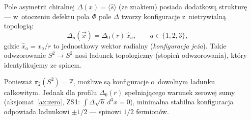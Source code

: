 \begin{hypothesis}%
\label{hyp:spin-chirality}
Pole asymetrii chiralnej $\Delta(x) = \langle\hat{s}\rangle$ (ze znakiem)
posiada dodatkow\k{a} struktur\k{e} --- w~otoczeniu defektu pola $\Phi$
pole $\Delta$ tworzy konfiguracje z~nietrywialn\k{a} topologi\k{a}:
\begin{equation}\label{eq:Delta-hedgehog}
  \Delta_a(\vec{x}) = \Delta_0(r)\,\hat{x}_a,
  \qquad a \in \{1,2,3\},
\end{equation}
gdzie $\hat{x}_a = x_a/r$ to jednostkowy wektor radialny
(\emph{konfiguracja je\.za}). Takie odwzorowanie
$S^2 \to S^2$ nosi \l{}adunek topologiczny (stopie\'n
odwzorowania), kt\'ory identyfikujemy ze spinem.

Poniewa\.z $\pi_2(S^2) = \mathbb{Z}$, mo\.zliwe s\k{a}
konfiguracje o~dowolnym \l{}adunku ca\l{}kowitym. Jednak
dla profilu $\Delta_0(r)$ spe\l{}niaj\k{a}cego warunek
zerowej sumy (aksjomat~\ref{ax:zero}, ZS1:
$\int\Delta\sqrt{h}\,d^3x = 0$), minimalna stabilna
konfiguracja odpowiada \l{}adunkowi $\pm 1/2$
--- spinowi $1/2$ fermion\'ow.
\end{hypothesis}

